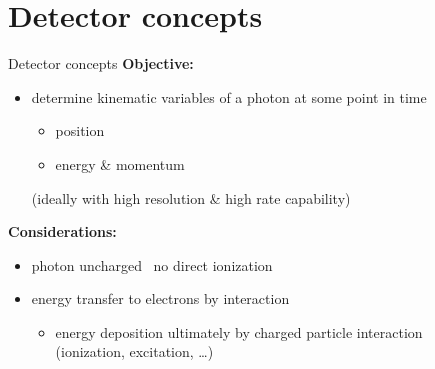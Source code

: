 \documentclass[11pt,xcolor=dvipsnames,professionalfonts]{beamer}
\begin{document}

\section{Detector concepts}

\begin{frame}{Detector concepts}
	\textbf{Objective:}
	\begin{itemize}
		\setlength\itemsep{1.em}
		\item  determine kinematic variables of a photon at some point in time
		\begin{itemize}
			\item position
			\item energy \& momentum
		\end{itemize}
		(ideally with high resolution \& high rate capability)
	\end{itemize}
	\vfill
	
	\textbf{Considerations:}
	\begin{itemize}
		\setlength\itemsep{1.em}
		\item photon uncharged \textrightarrow~no direct ionization
		
		\item energy transfer to electrons by interaction
		\begin{itemize}
			\item energy deposition ultimately by charged particle interaction\\(ionization, excitation, \dots)
		\end{itemize}
	\end{itemize}
	
\end{frame}

\end{document}
